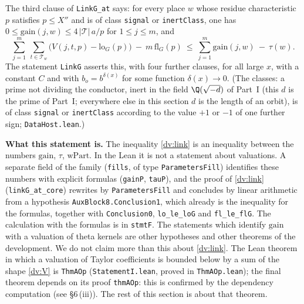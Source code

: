 \documentclass[11pt,letterpaper]{article}
\begin{document}
The third clause of \texttt{LinkG\_at} says: for every place $w$ whose residue characteristic $p$ satisfies
$p\le X''$ and is of class \texttt{signal} or \texttt{inertClass}, one has
$0\le\mathrm{gain}(j,w)\le4\,|\mathcal T|\,a/p$ for $1\le j\le m$, and
\begin{equation}\label{dv:link}
 \sum_{j=1}^m\ \sum_{t\in\mathcal T_w}\Big(V(j,t,p)-\mathrm{lo}_G(p)\Big)\ -\ m\,\mathrm{fl}_G(p)
 \ \le\ \sum_{j=1}^m\mathrm{gain}(j,w)\ -\ \tau(w).
\end{equation}
The statement \texttt{LinkG} asserts this, with four further clauses, for all large $x$, with a constant $C$
and with $b_o=b^{\delta(x)}$ for some function $\delta(x)\to0$. (The classes: a prime not dividing the
conductor, inert in the field $\Q(\sqrt{-d})$ of Part~I (this $d$ is the prime of Part~I; everywhere else in this
section $d$ is the length of an orbit), is of class \texttt{signal} or \texttt{inertClass} according to the
value $+1$ or $-1$ of one further sign; \texttt{DataHost.lean}.)

\textbf{What this statement is.} The inequality \eqref{dv:link} is an inequality between the numbers
$\mathrm{gain}$, $\tau$, $\mathrm{wPart}$. In the Lean it is not a statement about valuations. A separate
field of the family (\texttt{fills}, of type \texttt{ParametersFill}) identifies these numbers with explicit
formulas (\texttt{gainP}, \texttt{tauP}), and the proof of \eqref{dv:link} (\texttt{linkG\_at\_core}) rewrites by \texttt{ParametersFill} and
concludes by linear arithmetic from a hypothesis \texttt{AuxBlock8.Conclusion1}, which already is the
inequality for the formulas, together with \texttt{Conclusion0}, \texttt{lo\_le\_loG} and
\texttt{fl\_le\_flG}. The calculation with the formulas is in \texttt{stmtF}. The statements which identify $\mathrm{gain}$ with a valuation of theta
kernels are other hypotheses and other theorems of the development. We do not claim more than this about
\eqref{dv:link}. The Lean theorem in which a valuation of Taylor coefficients is bounded below by a sum of
the shape \eqref{dv:V} is \texttt{ThmAOp} (\texttt{StatementI.lean}, proved in \texttt{ThmAOp.lean}); the
final theorem depends on its proof \texttt{thmAOp}: this is confirmed by the dependency computation
(see \S6\,(iii)). The rest of this section is about that theorem.
\end{document}
